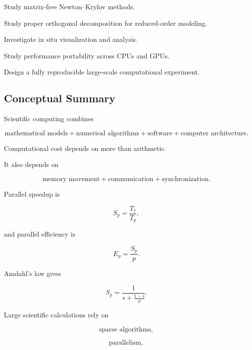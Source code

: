 \begin{exercise}[4]
Study matrix-free Newton--Krylov methods.
\end{exercise}

\begin{exercise}[4]
Study proper orthogonal decomposition for reduced-order modeling.
\end{exercise}

\begin{exercise}[4]
Investigate in situ visualization and analysis.
\end{exercise}

\begin{exercise}[4]
Study performance portability across CPUs and GPUs.
\end{exercise}

\begin{exercise}[4]
Design a fully reproducible large-scale computational experiment.
\end{exercise}

\subsection{Conceptual Summary}
\label{subsec:scientific-computing-summary}

Scientific computing combines

\[
\boxed{
\text{mathematical models}
+
\text{numerical algorithms}
+
\text{software}
+
\text{computer architecture}.
}
\]

Computational cost depends on more than arithmetic.

It also depends on

\[
\boxed{
\text{memory movement}
+
\text{communication}
+
\text{synchronization}.
}
\]

Parallel speedup is

\[
\boxed{
S_p
=
\frac{
T_1
}{
T_p
},
}
\]

and parallel efficiency is

\[
\boxed{
E_p
=
\frac{
S_p
}{
p
}.
}
\]

Amdahl's law gives

\[
\boxed{
S_p
=
\frac{
1
}{
s+\frac{1-s}{p}
}.
}
\]

Large scientific calculations rely on

\[
\boxed{
\text{sparse algorithms},
}
\]

\[
\boxed{
\text{parallelism},
}
\]

